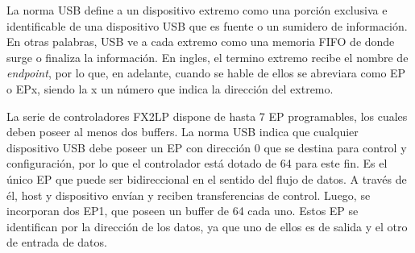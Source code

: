 	La norma USB define a un dispositivo extremo como una porción exclusiva e identificable de una dispositivo USB que es fuente o un sumidero de información. En otras palabras, USB ve a cada extremo como una memoria FIFO de donde surge o finaliza la información. En ingles, el termino extremo recibe el nombre de {\it endpoint}, por lo que, en adelante, cuando se hable de ellos se abreviara como EP o EPx, siendo la x un número que indica la dirección del extremo.%
	
	La serie de controladores FX2LP dispone de hasta 7 EP programables, los cuales deben poseer al menos dos buffers. La norma USB indica que cualquier dispositivo USB debe poseer un EP con dirección 0 que se destina para control y configuración, por lo que el controlador está dotado de \SI{64}{\byte} para este fin. Es el único EP que puede ser bidireccional en el sentido del flujo de datos. A través de él, host y dispositivo envían y reciben transferencias de control. Luego, se incorporan dos EP1, que poseen un buffer de \SI{64}{\byte} cada uno. Estos EP se identifican por la dirección de los datos, ya que uno de ellos es de salida y el otro de entrada de datos.%
	
